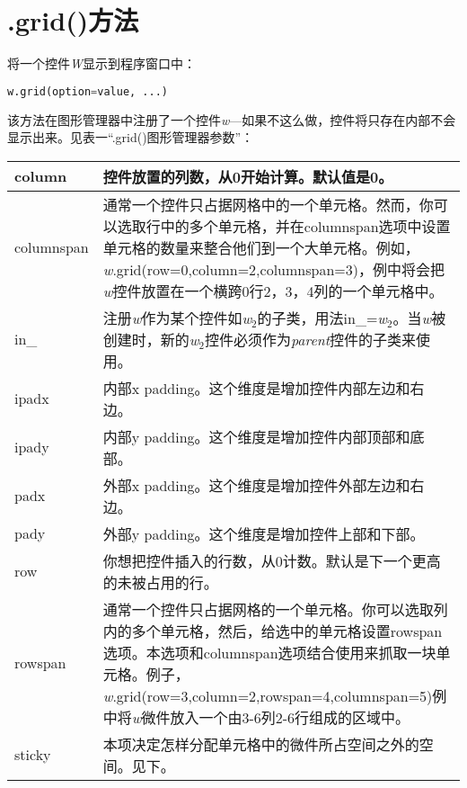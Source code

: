 \section[.grid()方法]{.grid()方法}
将一个控件\textit{W}显示到程序窗口中：
\begin{lstlisting}[language=python]
w.grid(option=value, ...)
\end{lstlisting}
该方法在图形管理器中注册了一个控件\textit{w}---如果不这么做，控件将只存在内部不会显示出来。见表一“.grid()图形管理器参数”：
\begin{longtable}{|l|p{}|}

\hline
\textsf
column &
控件放置的列数，从0开始计算。默认值是0。\\ \hline
columnspan & 
通常一个控件只占据网格中的一个单元格。然而，你可以选取行中的多个单元格，并在columnspan选项中设置单元格的数量来整合他们到一个大单元格。例如，\textit{w}.grid(row=0,column=2,columnspan=3)，例中将会把\textit{w}控件放置在一个横跨0行2，3，4列的一个单元格中。\\ \hline
in\_ &
注册\textit{w}作为某个控件如\textit{w$_2$}的子类，用法in\_=\textit{w$_2$}。当\textit{w}被创建时，新的\textit{w$_2$}控件必须作为\textit{parent}控件的子类来使用。\\ \hline
ipadx &
内部x padding。这个维度是增加控件内部左边和右边。\\ \hline
ipady &
内部y padding。这个维度是增加控件内部顶部和底部。\\ \hline
padx &
外部x padding。这个维度是增加控件外部左边和右边。\\ \hline
pady &
外部y padding。这个维度是增加控件上部和下部。\\ \hline
row &
你想把控件插入的行数，从0计数。默认是下一个更高的未被占用的行。\\ \hline
rowspan &
通常一个控件只占据网格的一个单元格。你可以选取列内的多个单元格，然后，给选中的单元格设置rowspan选项。本选项和columnspan选项结合使用来抓取一块单元格。例子，\textit{w}.grid(row=3,column=2,rowspan=4,columnspan=5)例中将\textit{w}微件放入一个由3-6列2-6行组成的区域中。\\ \hline
sticky &
本项决定怎样分配单元格中的微件所占空间之外的空间。见下。\\ \hline
\end{longtable}

